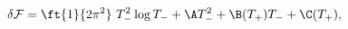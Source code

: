 \begin{equation}\label{deltaF}
\delta \mathcal{F}= \ft{1}{2\pi^2}\ T_-^2\log T_- + \A T_{-}^{2} +
\B(T_{+})T_{-} + \C(T_{+}),
\end{equation}

